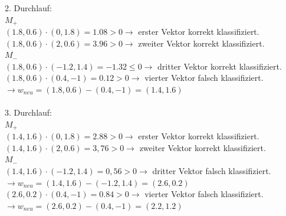 \documentclass[fontsize=11pt]{scrartcl}
\begin{document}
                        2. Durchlauf:\\
                        $M_+$\\
                        $(1.8,0.6)\cdot (0,1.8) = 1.08 > 0 \rightarrow$ erster Vektor korrekt klassifiziert.\\
                        $(1.8,0.6)\cdot (2,0.6) = 3.96 > 0 \rightarrow$ zweiter Vektor korrekt klassifiziert.\\
                        $M_-$\\
                        $(1.8,0.6)\cdot (-1.2,1.4) = -1.32 \leq 0 \rightarrow$ dritter Vektor korrekt klassifiziert.\\
                        $(1.8,0.6)\cdot (0.4,-1) = 0.12 > 0 \rightarrow$ vierter Vektor falsch klassifiziert.\\
                        $\rightarrow w_{neu} = (1.8,0.6)-(0.4,-1) = (1.4,1.6)$\\
                        \\
                        3. Durchlauf:\\
                        $M_+$\\
                        $(1.4,1.6)\cdot (0,1.8) = 2.88 > 0 \rightarrow$ erster Vektor korrekt klassifiziert.\\
                        $(1.4,1.6)\cdot (2,0.6) = 3,76 > 0 \rightarrow$ zweiter Vektor korrekt klassifiziert.\\
                        $M_-$\\
                        $(1.4,1.6) \cdot (-1.2,1.4) = 0,56 > 0 \rightarrow$ dritter Vektor falsch klassifiziert.\\
                        $\rightarrow w_{neu} = (1.4,1.6)-(-1.2,1.4) = (2.6,0.2)$\\
                        $(2.6,0.2)\cdot (0.4,-1) = 0.84 > 0 \rightarrow$ vierter Vektor falsch klassifiziert.\\
                        $\rightarrow w_{neu} = (2.6,0.2)-(0.4,-1) = (2.2,1.2)$\\
\end{document}
